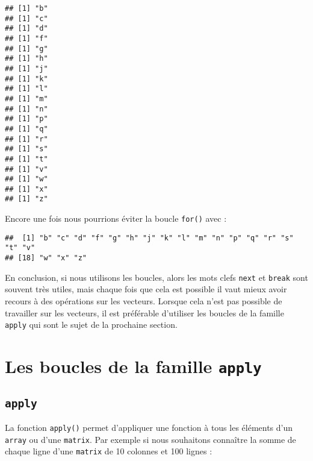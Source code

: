 \documentclass[]{book}
\newenvironment{Shaded}{\begin{snugshade}}{\end{snugshade}}
\newcommand{\KeywordTok}[1]{\textcolor[rgb]{0.13,0.29,0.53}{\textbf{#1}}}
\newcommand{\StringTok}[1]{\textcolor[rgb]{0.31,0.60,0.02}{#1}}
\newcommand{\OperatorTok}[1]{\textcolor[rgb]{0.81,0.36,0.00}{\textbf{#1}}}
\newcommand{\NormalTok}[1]{#1}
\theoremstyle{definition}
\theoremstyle{definition}
\theoremstyle{definition}
\theoremstyle{remark}
\begin{document}
\begin{verbatim}
## [1] "b"
## [1] "c"
## [1] "d"
## [1] "f"
## [1] "g"
## [1] "h"
## [1] "j"
## [1] "k"
## [1] "l"
## [1] "m"
## [1] "n"
## [1] "p"
## [1] "q"
## [1] "r"
## [1] "s"
## [1] "t"
## [1] "v"
## [1] "w"
## [1] "x"
## [1] "z"
\end{verbatim}

Encore une fois nous pourrions éviter la boucle \texttt{for()} avec :

\begin{Shaded}
\end{Shaded}

\begin{verbatim}
##  [1] "b" "c" "d" "f" "g" "h" "j" "k" "l" "m" "n" "p" "q" "r" "s" "t" "v"
## [18] "w" "x" "z"
\end{verbatim}

En conclusion, si nous utilisons les boucles, alors les mots clefs
\texttt{next} et \texttt{break} sont souvent très utiles, mais chaque
fois que cela est possible il vaut mieux avoir recours à des opérations
sur les vecteurs. Lorsque cela n'est pas possible de travailler sur les
vecteurs, il est préférable d'utiliser les boucles de la famille
\texttt{apply} qui sont le sujet de la prochaine section.

\hypertarget{l17applyfamily}{\section{\texorpdfstring{Les boucles de la
famille
\texttt{apply}}{Les boucles de la famille apply}}\label{l17applyfamily}}

\subsection{\texorpdfstring{\texttt{apply}}{apply}}\label{l17apply}

La fonction \texttt{apply()} permet d'appliquer une fonction à tous les
éléments d'un \texttt{array} ou d'une \texttt{matrix}. Par exemple si
nous souhaitons connaître la somme de chaque ligne d'une \texttt{matrix}
de 10 colonnes et 100 lignes :
\end{document}
